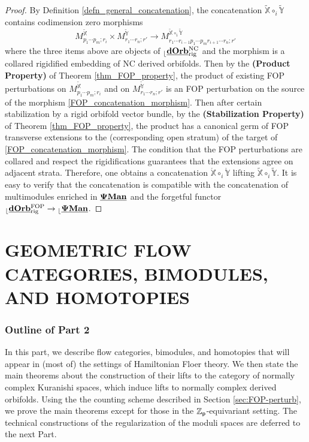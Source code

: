 \documentclass[reqno, 10pt]{amsart}
\numberwithin{equation}{section}
\numberwithin{equation}{section}
\theoremstyle{definition}
\theoremstyle{remark}
\newcommand{\beq}{\begin{equation}}
\newcommand{\eeq}{\end{equation}}
\newcommand{\mb}{\mathbb}
\newcommand{\zp}{{{\mb Z}_{\sf p}}}
\renewcommand{\outer}{{}_{\lfloor}}
\newcommand{\pman}{\uds{{\bf \Psi}{\bf Man}}}
\newcommand{\uds}[1]{\underline{\smash{#1}}}
\begin{document}
\begin{proof}
By Definition \ref{defn_general_concatenation}, the concatenation $\tilde {\mb X} \circ_i \tilde {\mb Y}$ contains codimension zero morphisms
\beq\label{FOP_concatenation_morphism}
M_{p_1 \cdots p_m; r_i}^{\tilde{\mb X}} \times M_{r_1 \cdots r_n; r'}^{\tilde {\mb Y}} \to M_{r_1 \cdots r_{i-1} p_1 \cdots p_m r_{i+1} \cdots r_n; r'}^{\tilde {\mb X} \circ_i \tilde {\mb Y}}
\eeq
where the three items above are objects of $\outer \uds{\bf dOrb}_{\rm rig}^{\rm NC}$ and the morphism is a collared rigidified embedding of NC derived orbifolds. Then by the {\bf (Product Property)} of Theorem \ref{thm_FOP_property}, the product of existing FOP perturbations on $M_{p_1 \cdots p_m; r_i}^{\tilde {\mb X}}$ and on $M_{r_1 \cdots r_n; r'}^{\tilde {\mb Y}}$ is an FOP perturbation on the source of the morphism \eqref{FOP_concatenation_morphism}. Then after certain stabilization by a rigid orbifold vector bundle, by the {\bf (Stabilization Property)} of Theorem \ref{thm_FOP_property}, the product has a canonical germ of FOP transverse extensions to the (corresponding open stratum) of the target of \eqref{FOP_concatenation_morphism}. The condition that the FOP perturbations are collared and respect the rigidifications guarantees that the extensions agree on adjacent strata. Therefore, one obtains a concatenation $\mathring {\mb X} \circ_i \mathring {\mb Y}$ lifting $\tilde{\mb X} \circ_i \tilde {\mb Y}$. It is easy to verify that the concatenation is compatible with the concatenation of multimodules enriched in $\pman$ and the forgetful functor $\outer\uds{\bf dOrb}_{\rm rig}^{\rm FOP} \to \outer \pman$.  
\end{proof}








\newpage

\part{GEOMETRIC FLOW CATEGORIES, BIMODULES, AND HOMOTOPIES}

\section*{Outline of Part 2}

In this part, we describe flow categories, bimodules, and homotopies that will appear in (most of) the settings of Hamiltonian Floer theory. We then state the main theorems about the construction of their lifts to the category of normally complex Kuranishi spaces, which induce lifts to normally complex derived orbifolds. Using the the counting scheme described in Section \ref{sec:FOP-perturb}, we prove the main theorems except for those in the $\zp$-equivariant setting. The technical constructions of the regularization of the moduli spaces are deferred to the next Part.
\end{document}
